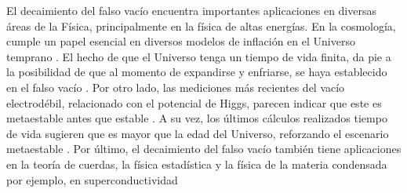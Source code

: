 El decaimiento del falso vacío encuentra importantes aplicaciones en diversas áreas de la Física, principalmente en la física de altas energías. En la cosmología, cumple un papel esencial en diversos modelos de inflación en el Universo temprano \cite{guth2007eternal}. El hecho de que el Universo tenga un tiempo de vida finita, da pie a la posibilidad de que al momento de expandirse y enfriarse, se haya establecido en el falso vacío \cite{coleman1977fate}.   Por otro lado, las mediciones más recientes del vacío electrodébil, relacionado con el potencial de Higgs, parecen indicar que este es metaestable antes que estable \cite{bass2021higgs}. A su vez, los últimos cálculos realizados  tiempo de vida sugieren que es mayor que la edad del Universo, reforzando el escenario metaestable \cite{andreassen2018scale}. Por último, el decaimiento del falso vacío también tiene aplicaciones en la teoría de cuerdas, la física estadística y la física de la materia condensada por ejemplo, en superconductividad \cite{paranjape2017theory}   %

